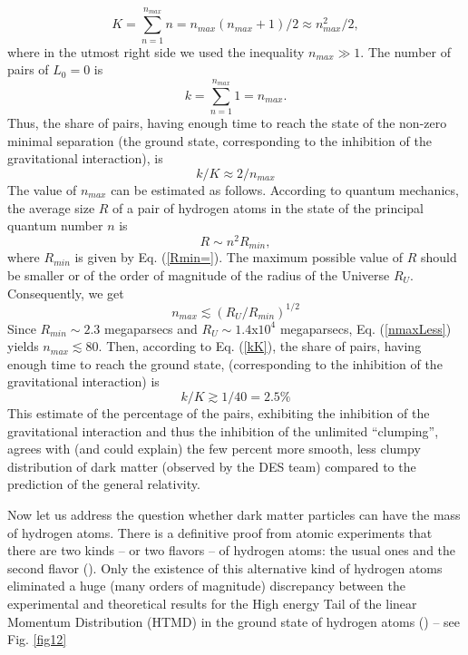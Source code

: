 \documentclass[referee]{raa}            %
\begin{document}
	\begin{equation}
		K=\sum_{n=1}^{n_{max}}n=n_{max}(n_{max}+1)/2\approx n_{max}^2/2,
		\label{Ksum}
	\end{equation}
	where in the utmost right side we used the inequality $n_{max} \gg 1 $. The number of pairs of $L_0 = 0$ is 
	\begin{equation}
		k=\sum_{n=1}^{n_{max}}1=n_{max}.
		\label{k}
	\end{equation}
	Thus, the share of pairs, having enough time to reach the state of the non-zero minimal separation (the ground state, corresponding to the inhibition of the gravitational interaction), is
	\begin{equation}
	    k/K\approx 2/n_{max}
	    \label{kK}
	\end{equation}
The value of $n_{max}$ can be estimated as follows. According to quantum mechanics, the average size $R$ of a pair of hydrogen atoms in the state of the principal quantum number $n$ is
   \begin{equation}
   	R\sim n^2R_{min},
   	\label{Rapp}
   \end{equation}
where $R_{min}$ is given by Eq. (\ref{Rmin=}). The maximum possible value of $R$ should be smaller or of the order of magnitude of the radius of the Universe $R_U$. Consequently, we get
\begin{equation}
	n_{max}\lesssim(R_U/R_{min})^{1/2}
	\label{nmaxLess}
\end{equation}	
Since $R_{min} \sim 2.3$ megaparsecs and $R_U \sim 1.4$x$10^4$ megaparsecs, Eq. (\ref{nmaxLess}) yields $n_{max} \lesssim 80$. Then, according to Eq. (\ref{kK}), the share of pairs, having enough time to reach the ground state, (corresponding to the inhibition of the gravitational interaction) is 
\begin{equation}
	k/K\gtrsim 1/40=2.5\%
\end{equation}
This estimate of the percentage of the pairs, exhibiting the inhibition of the gravitational interaction and thus the inhibition of the unlimited “clumping”, agrees with (and could explain) the few percent more smooth, less clumpy distribution of dark matter (observed by the DES team) compared to the prediction of the general relativity.
\par Now let us address the question whether dark matter particles can have the mass of hydrogen atoms. There is a definitive proof from atomic experiments that there are two kinds – or two flavors – of hydrogen atoms: the usual ones and the second flavor (\citealt{Oks+2001}). Only the existence of this alternative kind of hydrogen atoms eliminated a huge (many orders of magnitude) discrepancy between the experimental and theoretical results for the High energy Tail of the linear Momentum Distribution (HTMD) in the ground state of hydrogen atoms (\citealt{Oks+2001}) – see Fig. \ref{fig12}%
\end{document}
